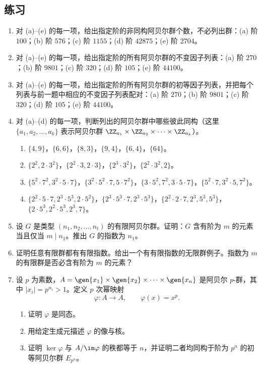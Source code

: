 \subsection*{练习}
\begin{enumerate}[label=\arabic*.]
  \item 对 (a)--(e) 的每一项，给出指定阶的非同构阿贝尔群个数，不必列出群：(a) 阶 $100$；(b) 阶 $576$；(c) 阶 $1155$；(d) 阶 $42875$；(e) 阶 $2704$。

  \item 对 (a)--(e) 的每一项，给出指定阶的所有阿贝尔群的不变因子列表：(a) 阶 $270$；(b) 阶 $9801$；(c) 阶 $320$；(d) 阶 $105$；(e) 阶 $44100$。

  \item 对 (a)--(e) 的每一项，给出指定阶的所有阿贝尔群的初等因子列表，并把每个列表与前一题中相应的不变因子列表配对：(a) 阶 $270$；(b) 阶 $9801$；(c) 阶 $320$；(d) 阶 $105$；(e) 阶 $44100$。

  \item 对 (a)--(d) 的每一项，判断列出的阿贝尔群中哪些彼此同构（这里 $\{a_1,a_2,
\ldots,a_k\}$ 表示阿贝尔群 $\ZZ_{a_1}\times\ZZ_{a_2}\times\cdots\times\ZZ_{a_k}$）。
  \begin{enumerate}[label=(\alph*)]
    \item $\{4,9\}$，$\{6,6\}$，$\{8,3\}$，$\{9,4\}$，$\{6,4\}$，$\{64\}$。
    \item $\{2^2,2\cdot3^2\}$，$\{2^2\cdot3,2\cdot3\}$，$\{2^3\cdot3^2\}$，$\{2^2\cdot3^2,2\}$。
    \item $\{5^2\cdot7^2,3^2\cdot5\cdot7\}$，$\{3^2\cdot5^2\cdot7,5\cdot7^2\}$，$\{3\cdot5^2,7^2,3\cdot5\cdot7\}$，$\{5^2\cdot7,3^2\cdot5,7^2\}$。
    \item $\{2^2\cdot5\cdot7,2^3\cdot5^3,2\cdot5^2\}$，$\{2^3\cdot5^3\cdot7,2^3\cdot5^3\}$，$\{2^2\cdot2\cdot7,2^3,5^3,5^3\}$，$\{2\cdot5^3,2^2\cdot5^3,2^3,7\}$。
  \end{enumerate}

  \item 设 $G$ 是类型 $(n_1,n_2,
\ldots,n_t)$ 的有限阿贝尔群。证明：$G$ 含有阶为 $m$ 的元素当且仅当 $m\mid n_1$。推出 $G$ 的指数为 $n_1$。

  \item 证明任意有限群都有有限指数。给出一个有有限指数的无限群例子。指数为 $m$ 的有限群是否必含有阶为 $m$ 的元素？

  \item 设 $p$ 为素数，$A=\gen{x_1}\times\gen{x_2}\times\cdots\times\gen{x_n}$ 是阿贝尔 $p$-群，其中 $|x_i|=p^{\alpha_i}>1$。定义 $p$ 次幂映射
  \[
    \varphi:A\to A,
\qquad \varphi(x)=x^p.
  \]
  \begin{enumerate}[label=(\alph*)]
    \item 证明 $\varphi$ 是同态。
    \item 用给定生成元描述 $\varphi$ 的像与核。
    \item 证明 $\ker\varphi$ 与 $A/\im\varphi$ 的秩都等于 $n$，并证明二者均同构于阶为 $p^n$ 的初等阿贝尔群 $E_{p^n}$。
  \end{enumerate}


\end{enumerate}
